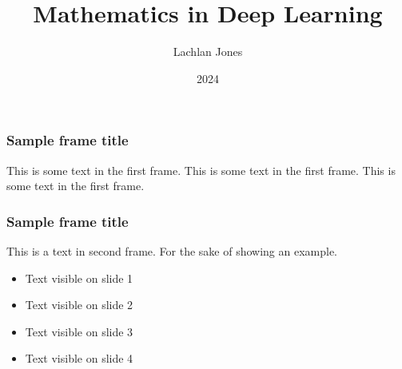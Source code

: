 \documentclass{beamer}
\title{Mathematics in Deep Learning}
\author{Lachlan Jones}
\institute{Math199}
\date{2024}
\begin{document}
\frame{\titlepage}

\begin{frame}
    \frametitle{Sample frame title}
    This is some text in the first frame. This is some text in the first frame. This is some text in the first frame.
\end{frame}

\begin{frame}
    \frametitle{Sample frame title}
    This is a text in second frame.
    For the sake of showing an example.

    \begin{itemize}
        \item Text visible on slide 1 \pause
        \item Text visible on slide 2 \pause
        \item Text visible on slide 3 \pause
        \item Text visible on slide 4
    \end{itemize}
\end{frame}
\end{document}
